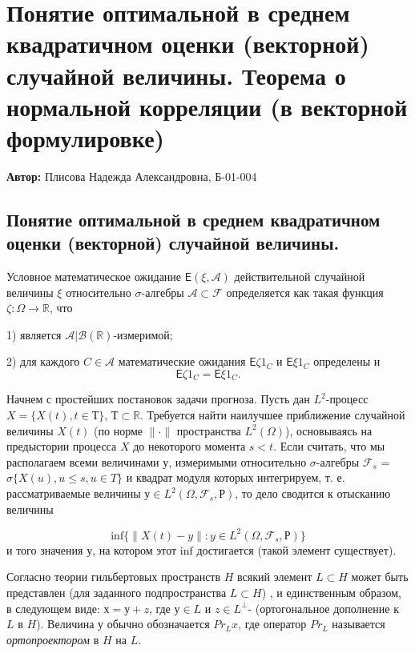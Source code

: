 
\section{Понятие оптимальной в среднем квадратичном оценки (векторной) случайной величины. Теорема о нормальной корреляции (в векторной формулировке)}

\textbf{Автор:} Плисова Надежда Александровна, Б-01-004

\subsection{Понятие оптимальной в среднем квадратичном оценки (векторной) случайной величины.}
\begin{definition}  Условное математическое ожидание $\mathsf{E}(\xi,\mathscr{A})$ действительной случайной величины $\xi$ относительно $\sigma$-алгебры $\mathscr{A} \subset \mathscr{F}$ определяется как
такая функция $\zeta: \Omega \rightarrow \mathbb{R}$, что


1) является $\mathscr{A}|\mathscr{B}(\mathbb{R})$-измеримой;


2) для каждого $C \in \mathscr{A}$ математические ожидания $\mathsf{E}\zeta1_C$ и $\mathsf{E}\xi1_C$ определены и
$$\mathsf{E}\zeta1_C=\mathsf{E}\xi1_C.$$

\end{definition}

Начнем с простейших постановок задачи прогноза. Пусть дан $L^2$-процесс $X = \{X(t), t \in Т \}$,
$Т \subset \mathbb{R}$. Требуется найти наилучшее приближение случайной величины $X (t)$ (по норме
$\parallel \cdot\parallel $ пространства $L^2(\Omega)$), основываясь на предыстории процесса $X$ до некоторого
момента $s < t$. Если считать, что мы располагаем всеми величинами у, измеримыми относительно
$\sigma$-алгебры $\mathscr{F}_s$ = $\sigma \{X(u), u \leq s, u \in T\}$ и
квадрат модуля которых интегрируем, т. е. рассматриваемые величины $у \in L^2 (\Omega, \mathscr{F}_s, Р)$,
то дело сводится к отысканию величины

$$\mathrm{inf}\{\parallel  X(t)-y\parallel :y\in L^2 (\Omega, \mathscr{F}_s, Р)\}$$
и того значения $у$, на котором этот $\mathrm{inf}$ достигается (такой элемент существует).


Согласно теории гильбертовых пространств $\textit{H}$ всякий элемент $L \subset H$ может
быть представлен (для заданного подпространства $L \subset H$) , и единственным образом, в следующем виде: $х = у + z$, где $у \in L$ и $z \in L^\perp$- (ортогональное дополнение
к $L$ в $\textit{H}$). Величина у обычно обозначается $Pr_L x$, где оператор $Pr_L$ называется \textit{ортопроектором} в $\textit{H}$ на $L$.


